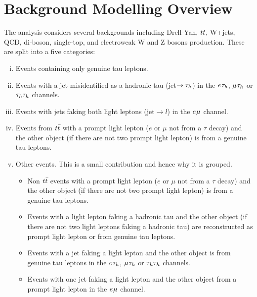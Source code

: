 \section{Background Modelling Overview}
\label{sec:background_modelling}

The analysis considers several backgrounds including Drell-Yan, $t\bar{t}$, W+jets, QCD, di-boson, single-top, and electroweak W and Z bosons production.
These are split into a five categories:
\begin{enumerate}[i)]
  \item Events containing only genuine tau leptons.
  \item Events with a jet misidentified as a hadronic tau (jet$\rightarrow \tau_{h}$) in the $e_{}\tau_{h}$, $\mu_{}\tau_{h}$ or $\tau_{h}\tau_{h}$ channels.
  \item Events with jets faking both light leptons (jet$\rightarrow l$) in the $e_{}\mu_{}$ channel.
  \item Events from $t\bar{t}$ with a prompt light lepton ($e$ or $\mu$ not from a $\tau$ decay) and the other object (if there are not two prompt light lepton) is from a genuine tau leptons.
  \item Other events. This is a small contribution and hence why it is grouped.
  \begin{itemize}
    \item Non $t\bar{t}$ events with a prompt light lepton ($e$ or $\mu$ not from a $\tau$ decay) and the other object (if there are not two prompt light lepton) is from a genuine tau leptons.
    \item Events with a light lepton faking a hadronic tau and the other object (if there are not two light leptons faking a hadronic tau) are reconstructed as prompt light lepton or from genuine tau leptons. 
    \item Events with a jet faking a light lepton and the other object is from genuine tau leptons in the $e_{}\tau_{h}$, $\mu_{}\tau_{h}$ or $\tau_{h}\tau_{h}$ channels.
    \item Events with one jet faking a light lepton and the other object from a prompt light lepton in the $e_{}\mu_{}$ channel.
   \end{itemize}
\end{enumerate}

